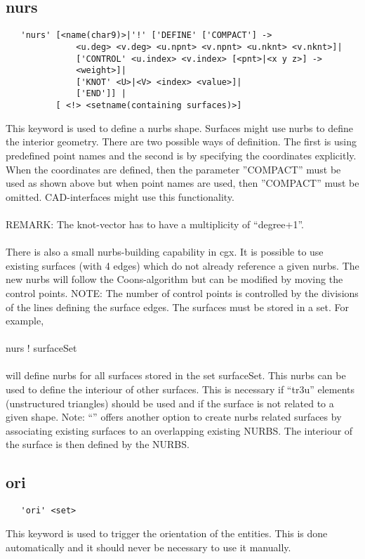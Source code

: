 \documentclass{article}
\begin{document}
\subsection{\label{nurs}nurs}
\begin{verbatim}
   'nurs' [<name(char9)>|'!' ['DEFINE' ['COMPACT'] ->
              <u.deg> <v.deg> <u.npnt> <v.npnt> <u.nknt> <v.nknt>]|
              ['CONTROL' <u.index> <v.index> [<pnt>|<x y z>] ->
              <weight>]|
              ['KNOT' <U>|<V> <index> <value>]|
              ['END']] |
          [ <!> <setname(containing surfaces)>]
\end{verbatim}
This keyword is used to define a nurbs shape. Surfaces might use nurbs to define the interior geometry. There are two possible ways of definition. The first is using predefined point names and the second is by specifying the coordinates explicitly. When the coordinates are defined, then the parameter ''COMPACT'' must be used as shown above but when point names are used, then ''COMPACT'' must be omitted. CAD-interfaces might use this functionality.\\\\REMARK: The knot-vector has to have a multiplicity of ``degree+1''.\\\\
There is also a small nurbs-building capability in cgx. It is possible to use
existing surfaces (with 4 edges) which do not already reference a given
nurbs. The new nurbs will follow the Coons-algorithm but can be modified by
moving the control points. NOTE: The number of control points is controlled by the
divisions of the lines defining the surface edges. The surfaces must be stored in a set. For
example,\\\\nurs ! surfaceSet\\\\will define nurbs for all surfaces stored in
the set surfaceSet. This nurbs can be used to define the interiour of other
surfaces. This is necessary if ``tr3u'' elements (unstructured triangles)
should be used and if the surface is not related to a given shape. Note:
``'' offers another option to create nurbs related
surfaces by associating existing surfaces to an overlapping existing
NURBS. The interiour of the surface is then defined by the NURBS.

\subsection{\label{ori}ori}
\begin{verbatim}
   'ori' <set> 
\end{verbatim}
This keyword is used to trigger the orientation of the entities. This is done automatically and it should never be necessary to use it manually.
\end{document}
